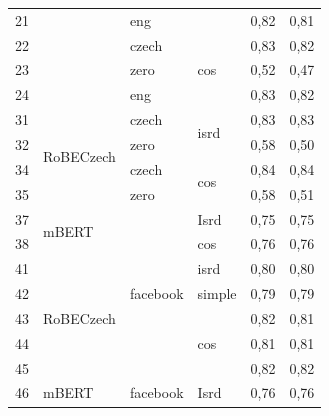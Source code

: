 \begin{table}[]
{\begin{tabular}{|l|l|l|l||ll|}
21 &                            & eng                       &                       & 0,82   & 0,81 \\ \cline{1-1} \cline{3-6} 
22 &                            & czech                     & \multirow{3}{*}{cos}  & 0,83   & 0,82 \\ \cline{1-1} \cline{3-3} \cline{5-6} 
23 &                            & zero                      &                       & 0,52   & 0,47 \\ \cline{1-1} \cline{3-3} \cline{5-6} 
24 &                            & eng                       &                       & 0,83   & 0,82 \\ \hline
31 & \multirow{4}{*}{RoBECzech} & czech                     & \multirow{2}{*}{isrd} & 0,83   & 0,83 \\ \cline{1-1} \cline{3-3} \cline{5-6} 
32 &                            & zero                      &                       & 0,58   & 0,50 \\ \cline{1-1} \cline{3-6} 
34 &                            & czech                     & \multirow{2}{*}{cos}  & 0,84   & 0,84 \\ \cline{1-1} \cline{3-3} \cline{5-6} 
35 &                            & zero                      &                       & 0,58   & 0,51 \\ \hline
37 & \multirow{2}{*}{mBERT}     & \multirow{7}{*}{facebook} & Isrd                  & 0,75   & 0,75 \\ \cline{1-1} \cline{4-6} 
38 &                            &                           & cos                   & 0,76   & 0,76 \\ \cline{1-2} \cline{4-6} 
41 & \multirow{5}{*}{RoBECzech} &                           & isrd                  & 0,80   & 0,80 \\ \cline{1-1} \cline{4-6} 
42 &                            &                           & simple                & 0,79   & 0,79 \\ \cline{1-1} \cline{4-6} 
43 &                            &                           & \multirow{3}{*}{cos}  & 0,82   & 0,81 \\ \cline{1-1} \cline{5-6} 
44 &                            &                           &                       & 0,81   & 0,81 \\ \cline{1-1} \cline{5-6} 
45 &                            &                           &                       & 0,82 & 0,82 \\ \hline
46 & \multirow{2}{*}{mBERT}     & \multirow{4}{*}{facebook} & Isrd                  & 0,76   & 0,76 \\ \cline{1-1} \cline{4-6} 

\end{tabular}}
\end{table}
